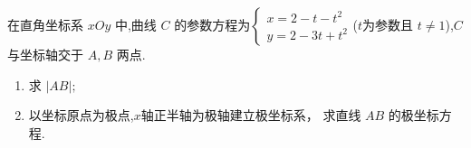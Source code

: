 \documentclass[class=ctexart,crop=false]{standalone}
\begin{document}
在直角坐标系 $xOy$ 中,曲线 $C$ 的参数方程为$\begin{cases}
    x=2-t-t^2\\
    y=2-3t+t^2
\end{cases}$($t$为参数且 $t \neq 1$),$C$ 与坐标轴交于 $A,B$ 两点.
\begin{enumerate}[label=(\arabic*)]
    \item 求 $|AB|;$
    \item 以坐标原点为极点,$x$轴正半轴为极轴建立极坐标系，
    求直线 $AB$ 的极坐标方程.
\end{enumerate}
\end{document}
